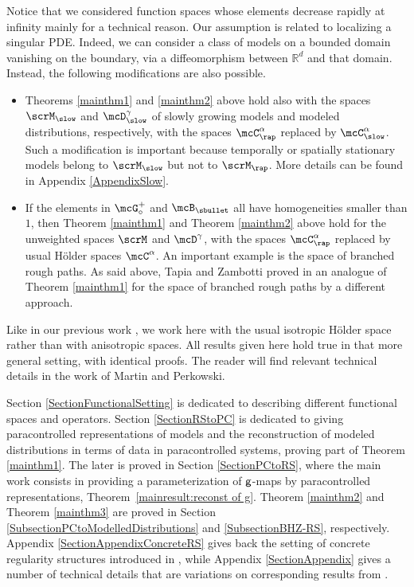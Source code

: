 Notice that we considered function spaces whose elements decrease rapidly at infinity mainly for a technical reason. Our assumption is related to localizing a singular PDE. Indeed, we can consider a class of models on a bounded domain vanishing on the boundary, via a diffeomorphism between $\mathbb{R}^d$ and that domain. Instead, the following modifications are also possible.
\begin{itemize}
\item Theorems \ref{mainthm1} and \ref{mainthm2} above hold also with the spaces $\scrM_{\slow}$ and $\mcD_{\slow}^\gamma$ of slowly growing models and modeled distributions, respectively, with the spaces $\mcC_{\rap}^\alpha$ replaced by $\mcC_{\slow}^\alpha$. Such a modification is important because temporally or spatially stationary models belong to $\scrM_{\slow}$ but not to $\scrM_{\rap}$. More details can be found in Appendix \ref{AppendixSlow}.

\item If the elements in $\mcG_\circ^+$ and $\mcB_\sbullet$ all have homogeneities smaller than $1$, then Theorem \ref{mainthm1} and Theorem \ref{mainthm2} above hold for the unweighted spaces $\scrM$ and $\mcD^\gamma$, with the spaces $\mcC_{\rap}^\alpha$ replaced by usual Hölder spaces $\mcC^\alpha$. An important example is the space of branched rough paths. As said above, Tapia and Zambotti proved in \cite{TZ18} an analogue of Theorem \ref{mainthm1} for the space of branched rough paths by a different approach.
\end{itemize}

Like in our previous work \cite{BH}, we work here with the usual isotropic Hölder space rather than with anisotropic spaces. All results given here hold true in that more general setting, with identical proofs. The reader will find relevant technical details in the work \cite{MP18} of Martin and Perkowski.\enlargethispage{.5\baselineskip}%

Section \ref{SectionFunctionalSetting} is dedicated to describing different functional spaces and operators. Section \ref{SectionRStoPC} is dedicated to giving paracontrolled representations of models and the recons\-truction of modeled distributions in terms of data in paracontrolled systems, proving part of Theorem \ref{mainthm1}. The later is proved in Section \ref{SectionPCtoRS}, where the main work consists in providing a parameterization of $\sf g$-maps by paracontrolled representations, Theorem~\ref{mainresult:reconst of g}. Theorem \ref{mainthm2} and Theorem \ref{mainthm3} are proved in Section \ref{SubsectionPCtoModelledDistributions} and \ref{SubsectionBHZ-RS}, respectively. Appendix \ref{SectionAppendixConcreteRS} gives back the setting of concrete regularity structures introduced in \cite{BH}, while Appendix \ref{SectionAppendix} gives a number of technical details that are variations on corresponding results from \cite{BH}.

